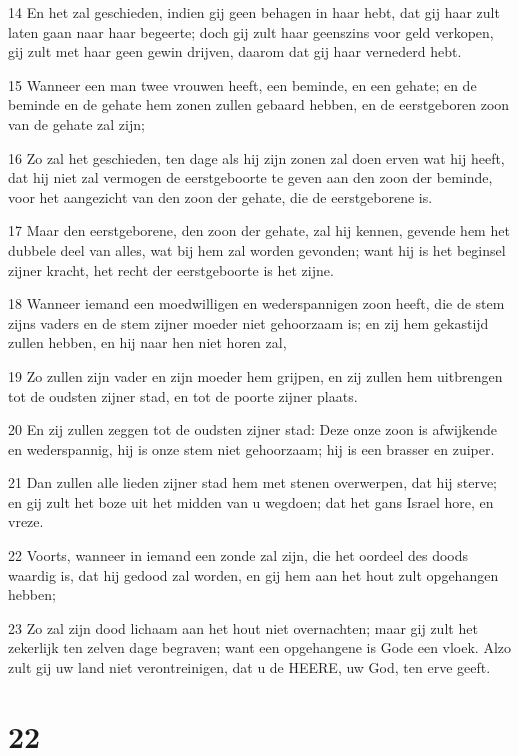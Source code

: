 \par 14 En het zal geschieden, indien gij geen behagen in haar hebt, dat gij haar zult laten gaan naar haar begeerte; doch gij zult haar geenszins voor geld verkopen, gij zult met haar geen gewin drijven, daarom dat gij haar vernederd hebt.
\par 15 Wanneer een man twee vrouwen heeft, een beminde, en een gehate; en de beminde en de gehate hem zonen zullen gebaard hebben, en de eerstgeboren zoon van de gehate zal zijn;
\par 16 Zo zal het geschieden, ten dage als hij zijn zonen zal doen erven wat hij heeft, dat hij niet zal vermogen de eerstgeboorte te geven aan den zoon der beminde, voor het aangezicht van den zoon der gehate, die de eerstgeborene is.
\par 17 Maar den eerstgeborene, den zoon der gehate, zal hij kennen, gevende hem het dubbele deel van alles, wat bij hem zal worden gevonden; want hij is het beginsel zijner kracht, het recht der eerstgeboorte is het zijne.
\par 18 Wanneer iemand een moedwilligen en wederspannigen zoon heeft, die de stem zijns vaders en de stem zijner moeder niet gehoorzaam is; en zij hem gekastijd zullen hebben, en hij naar hen niet horen zal,
\par 19 Zo zullen zijn vader en zijn moeder hem grijpen, en zij zullen hem uitbrengen tot de oudsten zijner stad, en tot de poorte zijner plaats.
\par 20 En zij zullen zeggen tot de oudsten zijner stad: Deze onze zoon is afwijkende en wederspannig, hij is onze stem niet gehoorzaam; hij is een brasser en zuiper.
\par 21 Dan zullen alle lieden zijner stad hem met stenen overwerpen, dat hij sterve; en gij zult het boze uit het midden van u wegdoen; dat het gans Israel hore, en vreze.
\par 22 Voorts, wanneer in iemand een zonde zal zijn, die het oordeel des doods waardig is, dat hij gedood zal worden, en gij hem aan het hout zult opgehangen hebben;
\par 23 Zo zal zijn dood lichaam aan het hout niet overnachten; maar gij zult het zekerlijk ten zelven dage begraven; want een opgehangene is Gode een vloek. Alzo zult gij uw land niet verontreinigen, dat u de HEERE, uw God, ten erve geeft.

\chapter{22}


